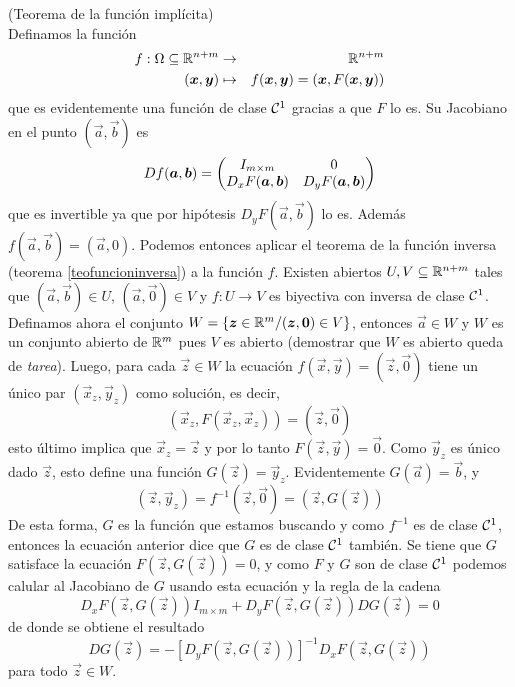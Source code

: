 \begin{demostracion}{\hspace{2mm} (Teorema de la funci\'on impl\'icita)}\\
Definamos la funci\'on
\begin{eqnarray*}
  f:\Omega\subseteq\R^{n+m} & \to & \R^{n+m} \\
  (\vec{x},\vec{y}) & \mapsto & f(\vec{x},\vec{y})=(\vec{x},F(\vec{x},\vec{y}))
\end{eqnarray*}
que es evidentemente una funci\'on de clase $\cl$ gracias a que
$F$ lo es. Su Jacobiano en el punto $(\vec{a},\vec{b})$ es
\[Df(\vec{a},\vec{b})=
\begin{pmatrix}
I_{m\times m} & 0 \cr 
D_x F(\vec{a},\vec{b}) & D_y F(\vec{a},\vec{b})
\end{pmatrix}\] que es invertible ya que por hip\'otesis $D_y F(\vec{a},\vec{b})$ lo es.
Adem\'as $f(\vec{a},\vec{b})=(\vec{a},0)$. Podemos entonces aplicar el teorema de la
funci\'on inversa (teorema \ref{teofuncioninversa}) a la funci\'on $f$. Existen abiertos
$U,V\subseteq \R^{n+m}$ tales que $(\vec{a},\vec{b})\in U$, $(\vec{a},\vec{0})\in V$ y
$f:U\to V$ es biyectiva con inversa de clase $\cl$. Definamos
ahora el conjunto $W=\{\vec{z}\in\R^m / (\vec{z},\vec{0})\in V\}$, entonces $\vec{a}\in
W$ y $W$ es un conjunto abierto de $\R^m$ pues $V$ es abierto (demostrar que $W$ es abierto 
queda de \emph{tarea}). Luego, para cada $\vec{z}\in
W$ la ecuaci\'on $f(\vec{x},\vec{y})=(\vec{z},\vec{0})$ tiene un \'unico par $(\vec{x}_z,\vec{y}_z)$
como soluci\'on, es decir,
\[(\vec{x}_z,F(\vec{x}_z,\vec{x}_z))=(\vec{z},\vec{0})\]
esto \'ultimo implica que $\vec{x}_z=\vec{z}$ y por lo tanto $F(\vec{z},\vec{y})=\vec{0}$. Como
$\vec{y}_z$ es \'unico dado $\vec{z}$, esto define una funci\'on $G(\vec{z})=\vec{y}_z$.
Evidentemente $G(\vec{a})=\vec{b}$, y
\[(\vec{z},\vec{y}_z)=f^{-1}(\vec{z},\vec{0})=(\vec{z},G(\vec{z}))\]
De esta forma, $G$ es la funci\'on que estamos buscando y como
$f^{-1}$ es de clase $\cl$, entonces la ecuaci\'on anterior dice
que $G$ es de clase $\cl$ tambi\'en. Se tiene que $G$ satisface la
ecuaci\'on $F(\vec{z},G(\vec{z}))=0$, y como $F$ y $G$ son de clase $\cl$
podemos calular al Jacobiano de $G$ usando esta ecuaci\'on y la
regla de la cadena
\[D_x F(\vec{z},G(\vec{z}))I_{m\times m}+D_y F(\vec{z},G(\vec{z}))DG(\vec{z})=0\]
de donde se obtiene el resultado
\[DG(\vec{z})=-[D_y F(\vec{z},G(\vec{z}))]^{-1}D_x F(\vec{z},G(\vec{z}))\]
para todo $\vec{z}\in W$.
\end{demostracion}

